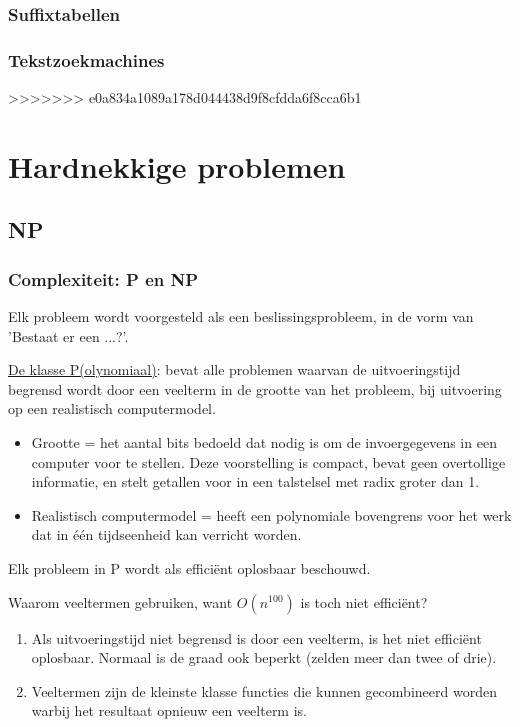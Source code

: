 \documentclass{report}
\begin{document}
\section{Suffixtabellen}
\section{Tekstzoekmachines}

>>>>>>> e0a834a1089a178d044438d9f8cfdda6f8cca6b1
\part{Hardnekkige problemen}
\chapter{NP}
\section{Complexiteit: P en NP}
Elk probleem wordt voorgesteld als een beslissingsprobleem, in de vorm van 'Bestaat er een ...?'.

\underline{De klasse P(olynomiaal)}: bevat alle problemen waarvan de uitvoeringstijd begrensd wordt door een veelterm in de grootte van het probleem, bij uitvoering op een realistisch computermodel.
\begin{itemize}
	\item Grootte = het aantal bits bedoeld dat nodig is om de invoergegevens in een computer voor te stellen. Deze voorstelling is compact, bevat geen overtollige informatie, en stelt getallen voor in een talstelsel met radix groter dan 1.
	\item Realistisch computermodel = heeft een polynomiale bovengrens voor het werk dat in één tijdseenheid kan verricht worden. 
\end{itemize}

Elk probleem in P wordt als efficiënt oplosbaar beschouwd.

Waarom veeltermen gebruiken, want $O(n^{100})$ is toch niet efficiënt?
\begin{enumerate}
	\item Als uitvoeringstijd niet begrensd is door een veelterm, is het niet efficiënt oplosbaar. Normaal is de graad ook beperkt (zelden meer dan twee of drie).
	\item Veeltermen zijn de kleinste klasse functies die kunnen gecombineerd worden warbij het resultaat opnieuw een veelterm is. 
\end{enumerate}
\end{document}
